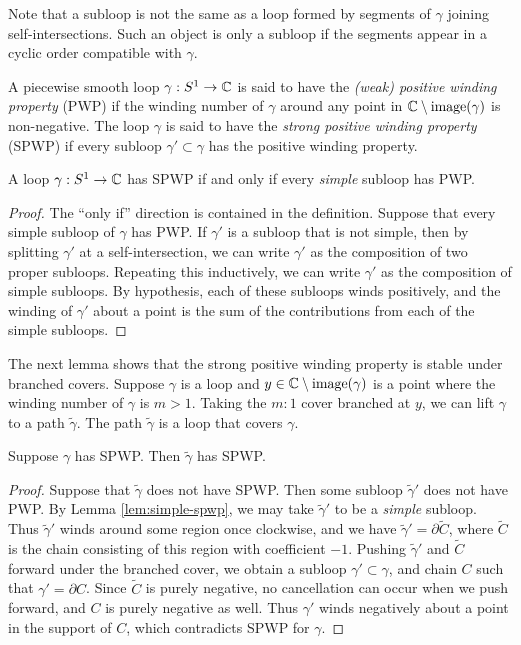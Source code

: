 \documentclass[12pt]{amsart}
\begin{document}
Note that a subloop is not the same as a loop formed by segments of
$\gamma$ joining self-intersections. Such an object is only a subloop
if the segments appear in a cyclic order compatible with $\gamma$.

\begin{definition}
  A piecewise smooth loop $\gamma: S^1 \to \mathbb{C}$ is said to have the
  \emph{(weak) positive winding property} (PWP) if the winding number of
  $\gamma$ around any point in $\mathbb{C} \setminus \operatorname{image}(\gamma)$ is
  non-negative. The loop $\gamma$ is said to have the \emph{strong
    positive winding property} (SPWP) if every subloop $\gamma' \subset
  \gamma$ has the positive winding property.
\end{definition}

\begin{lemma}
  \label{lem:simple-spwp}
  A loop $\gamma: S^1 \to \mathbb{C}$ has SPWP if and only if every
  \emph{simple} subloop has PWP.
\end{lemma}

\begin{proof}
  The ``only if'' direction is contained in the definition. Suppose
  that every simple subloop of $\gamma$ has PWP. If $\gamma'$ is a
  subloop that is not simple, then by splitting $\gamma'$ at a
  self-intersection, we can write $\gamma'$ as the composition of two
  proper subloops. Repeating this inductively, we can write $\gamma'$
  as the composition of simple subloops. By hypothesis, each of these
  subloops winds positively, and the winding of $\gamma'$ about a
  point is the sum of the contributions from each of the simple subloops.
\end{proof}

The next lemma shows that the strong positive winding property is
stable under branched covers. Suppose $\gamma$ is a loop and $y \in \mathbb{C}
\setminus \operatorname{image}(\gamma)$ is a point where the winding number of
$\gamma$ is $m > 1$. Taking the $m:1$ cover branched at $y$, we can
lift $\gamma$ to a path $\tilde{\gamma}$. The path $\tilde{\gamma}$ is
a loop that covers $\gamma$.
\begin{lemma}
  \label{lem:spwp}
  Suppose $\gamma$ has SPWP. Then $\tilde{\gamma}$ has SPWP.
\end{lemma}

\begin{proof}
  Suppose that $\tilde{\gamma}$ does not have SPWP. Then some subloop
  $\tilde{\gamma}'$ does not have PWP. By Lemma \ref{lem:simple-spwp},
  we may take $\tilde{\gamma}'$ to be a \emph{simple} subloop. Thus
  $\tilde{\gamma}'$ winds around some region once clockwise, and we
  have $\tilde{\gamma}' = \partial \tilde{C}$, where $\tilde{C}$ is
  the chain consisting of this region with coefficient $-1$. Pushing
  $\tilde{\gamma}'$ and $\tilde{C}$ forward under the branched cover,
  we obtain a subloop $\gamma' \subset \gamma$, and chain $C$ such
  that $\gamma' = \partial C$. Since $\tilde{C}$ is purely negative,
  no cancellation can occur when we push forward, and $C$ is purely
  negative as well. Thus $\gamma'$ winds negatively about a point in
  the support of $C$, which contradicts SPWP for $\gamma$.
\end{proof}
\end{document}

